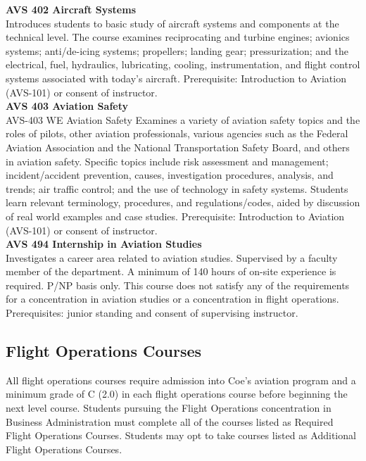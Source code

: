 \documentclass[
  letterpaper,
]{scrbook}
\begin{document}
\textbf{AVS 402 Aircraft Systems}\\
Introduces students to basic study of aircraft systems and components at
the technical level. The course examines reciprocating and turbine
engines; avionics systems; anti/de-icing systems; propellers; landing
gear; pressurization; and the electrical, fuel, hydraulics, lubricating,
cooling, instrumentation, and flight control systems associated with
today's aircraft. Prerequisite: Introduction to Aviation (AVS-101) or
consent of instructor.\\
\textbf{AVS 403 Aviation Safety}\\
AVS-403 WE Aviation Safety Examines a variety of aviation safety topics
and the roles of pilots, other aviation professionals, various agencies
such as the Federal Aviation Association and the National Transportation
Safety Board, and others in aviation safety. Specific topics include
risk assessment and management; incident/accident prevention, causes,
investigation procedures, analysis, and trends; air traffic control; and
the use of technology in safety systems. Students learn relevant
terminology, procedures, and regulations/codes, aided by discussion of
real world examples and case studies. Prerequisite: Introduction to
Aviation (AVS-101) or consent of instructor.\\
\textbf{AVS 494 Internship in Aviation Studies}\\
Investigates a career area related to aviation studies. Supervised by a
faculty member of the department. A minimum of 140 hours of on-site
experience is required. P/NP basis only. This course does not satisfy
any of the requirements for a concentration in aviation studies or a
concentration in flight operations. Prerequisites: junior standing and
consent of supervising instructor.

\subsection{Flight Operations Courses}\label{flight-operations-courses}

All flight operations courses require admission into Coe's aviation
program and a minimum grade of C (2.0) in each flight operations course
before beginning the next level course. Students pursuing the Flight
Operations concentration in Business Administration must complete all of
the courses listed as Required Flight Operations Courses. Students may
opt to take courses listed as Additional Flight Operations Courses.
\end{document}
